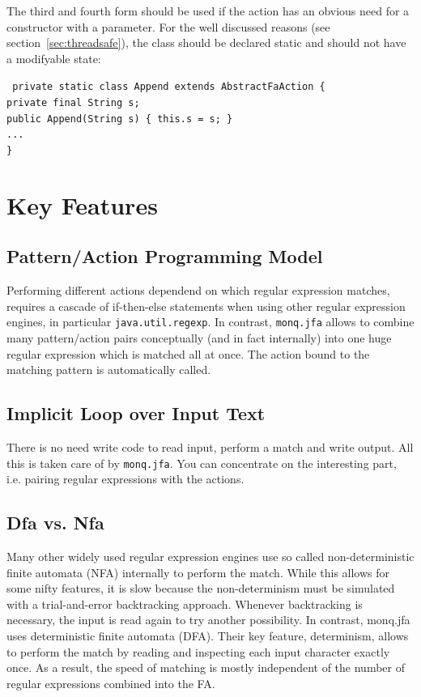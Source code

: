 \documentclass[12pt,a4paper,halfparskip]{scrartcl}
\newcommand{\monqjfa}{\texttt{monq.jfa}\xspace}
\newenvironment{codexa}%
{\begin{lrbox}{\codebox}\begin{minipage}{0.85\textwidth}\small\tt}
{\end{minipage}\end{lrbox}\begin{center}\setlength{\fboxrule}{1pt}\setlength{\fboxsep}{1em}\fcolorbox{codexab}{codexa}{\usebox{\codebox}}\end{center}}
\newcommand{\code}[1]{\texttt{#1}}
\newcommand{\T}{\hspace*{2ex}}
\begin{document}
The third and fourth form should be used if the action has an obvious
need for a constructor with a parameter. For the well discussed
reasons (see section~\ref{sec:threadsafe}), the class should be declared
static and should not have a modifyable state:

\begin{codexa}
  private static class Append extends AbstractFaAction \{\\
  \T private final String s;\\
  \T public Append(String s) \{ this.s = s; \}\\
  \T ...\\
  \}
\end{codexa}


\section{Key Features}\label{sec:keyfeatures}


\subsection{Pattern/Action Programming Model}
Performing different actions dependend on which regular expression
matches, requires a cascade of if-then-else statements when using
other regular expression engines, in particular \code{java.util.regexp}. In
contrast, \monqjfa allows to combine many pattern/action pairs
conceptually (and in fact internally) into one huge regular expression
which is matched all at once. The action bound to the matching pattern
is automatically called.

\subsection{Implicit Loop over Input Text}
There is no need write code to read input, perform a match and write
output. All this is taken care of by \monqjfa. You can concentrate on
the interesting part, i.e.{} pairing regular expressions with the
actions.

\subsection{Dfa vs.{} Nfa}
Many other widely used regular expression engines use so called
non-deterministic finite automata (NFA) internally to perform the
match. While this allows for some nifty features, it is slow because
the non-determinism must be simulated with a trial-and-error
backtracking approach. Whenever backtracking is necessary, the input
is read again to try another possibility. In contrast, monq.jfa uses
deterministic finite automata (DFA). Their key feature, determinism,
allows to perform the match by reading and inspecting each input
character exactly once. As a result, the speed of matching is mostly
independent of the number of regular expressions combined into the FA.
\end{document}
